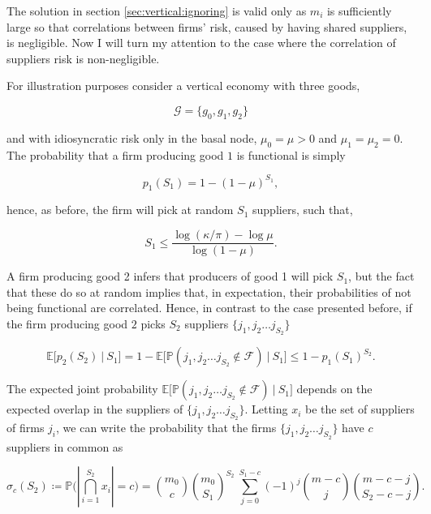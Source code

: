\documentclass[american, abstract=on]{scrartcl}
\newcommand{\F}{\mathcal{F}}
\newcommand{\G}{\mathcal{G}}
\renewcommand{\P}{\mathbb{P}}
\newcommand{\E}{\mathbb{E}}
\begin{document}
The solution in section \ref{sec:vertical:ignoring} is valid only as $m_i$ is sufficiently large so that correlations between firms' risk, caused by having shared suppliers, is negligible. Now I will turn my attention to the case where the correlation of suppliers risk is non-negligible. 

For illustration purposes consider a vertical economy with three goods,

\begin{equation}
  \G = \{g_0, g_1, g_2\}
\end{equation}

and with idiosyncratic risk only in the basal node, $\mu_0 = \mu > 0$ and $\mu_1 = \mu_2 = 0$. The probability that a firm producing good $1$ is functional is simply

\begin{equation}
  p_1(S_1) = 1 - (1 - \mu)^{S_1},
\end{equation}

hence, as before, the firm will pick at random $S_1$ suppliers, such that,

\begin{equation}
  S_1 \leq \frac{\log(\kappa / \pi) - \log \mu}{\log(1 - \mu)}.
\end{equation}

A firm producing good 2 infers that producers of good 1 will pick $S_1$, but the fact that these do so at random implies that, in expectation, their probabilities of not being functional are correlated. Hence, in contrast to the case presented before, if the firm producing good $2$ picks $S_2$ suppliers $\{j_1, j_2 \ldots j_{S_2}\}$

\begin{equation}
  \E \Big[ p_2(S_2) \ \vert \ S_1 \Big] = 1 - \E \Big[ \P\left( j_1, j_2 \ldots j_{S_2} \notin \F \right)  \ \vert \ S_1 \Big] \leq 1 - p_1(S_1)^{S_2}.
\end{equation}

The expected joint probability $\E \Big[ \P\left( j_1, j_2 \ldots j_{S_2} \notin \F \right)\ \vert \ S_1 \Big]$ depends on the expected overlap in the suppliers of $\{j_1, j_2 \ldots j_{S_2}\}$. Letting $x_{i}$ be the set of suppliers of firms $j_i$, we can write the probability that the firms $\{j_1, j_2 \ldots j_{S_2}\}$ have $c$ suppliers in common as

\begin{equation}
  \sigma_c(S_2) \coloneqq \P \Bigg( \left\lvert \bigcap^{S_2}_{i = 1} x_i \right\rvert = c \Bigg) = \binom{m_0}{c} \binom{m_0}{S_1}^{S_2} \ \sum^{S_1 - c}_{j = 0} (-1)^j \binom{m - c}{j} \binom{m - c - j}{S_2 - c - j}.
\end{equation}
\end{document}
